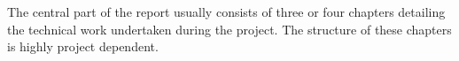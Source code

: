 \documentclass[11pt, a4paper]{article}
\begin{document}
\newcommand{\HRule}{\rule{\linewidth}{0.5mm}}

\newpage
{}

\newpage

\newpage
\tableofcontents
\newpage
{}
\newpage


\newpage

\newpage
\noindent The central part of the report
usually consists of three or four chapters
detailing the technical work undertaken during
the project. The structure of these chapters is
highly project dependent.
\newpage

\newpage

\newpage

\newpage

\newpage

\newpage

\newpage

\newpage




\newpage

\end{document}
